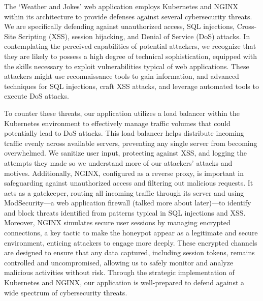 The `Weather and Jokes' web application employs Kubernetes and NGINX within its architecture to provide defenses against several cybersecurity threats. 
We are specifically defending against unauthorized access, SQL injections, Cross-Site Scripting (XSS), session hijacking, and Denial of Service (DoS) attacks. 
In contemplating the perceived capabilities of potential attackers, we recognize that they are likely to possess a high degree of technical sophistication, equipped with the skills necessary to exploit vulnerabilities typical of web applications. 
These attackers might use reconnaissance tools to gain information, and advanced techniques for SQL injections, craft XSS attacks, and leverage automated tools to execute DoS attacks.

To counter these threats, our application utilizes a load balancer within the Kubernetes environment to effectively manage traffic volumes that could potentially lead to DoS attacks. 
This load balancer helps distribute incoming traffic evenly across available servers, preventing any single server from becoming overwhelmed. We sanitize user input, protecting against XSS, and logging the attempts they made so we understand more of our attackers' attacks and motives. 
Additionally, NGINX, configured as a reverse proxy, is important in safeguarding against unauthorized access and filtering out malicious requests. 
It acts as a gatekeeper, routing all incoming traffic through its server and using ModSecurity—a web application firewall (talked more about later)—to identify and block threats identified from patterns typical in SQL injections and XSS.\@
Moreover, NGINX simulates secure user sessions by managing encrypted connections, a key tactic to make the honeypot appear as a legitimate and secure environment, enticing attackers to engage more deeply. 
These encrypted channels are designed to ensure that any data captured, including session tokens, remains controlled and uncompromised, allowing us to safely monitor and analyze malicious activities without risk.
Through the strategic implementation of Kubernetes and NGINX, our application is well-prepared to defend against a wide spectrum of cybersecurity threats.
